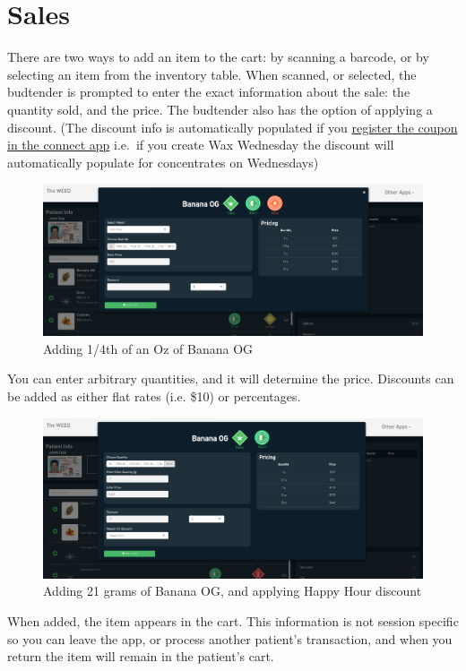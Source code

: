 \documentclass[]{book}
\theoremstyle{definition}
\theoremstyle{definition}
\theoremstyle{definition}
\theoremstyle{remark}
\begin{document}
\section{Sales}\label{sales}

There are two ways to add an item to the cart: by scanning a barcode, or
by selecting an item from the inventory table. When scanned, or
selected, the budtender is prompted to enter the exact information about
the sale: the quantity sold, and the price. The budtender also has the
option of applying a discount. (The discount info is automatically
populated if you \href{connect.html\#coupons}{register the coupon in the
connect app} i.e.~if you create Wax Wednesday the discount will
automatically populate for concentrates on Wednesdays)

\begin{figure}
\centering
\includegraphics{images/P5.png}
\caption{Adding 1/4th of an Oz of Banana OG}
\end{figure}

You can enter arbitrary quantities, and it will determine the price.
Discounts can be added as either flat rates (i.e. \$10) or percentages.

\begin{figure}
\centering
\includegraphics{images/P6.png}
\caption{Adding 21 grams of Banana OG, and applying Happy Hour discount}
\end{figure}

When added, the item appears in the cart. This information is not
session specific so you can leave the app, or process another patient's
transaction, and when you return the item will remain in the patient's
cart.
\end{document}
